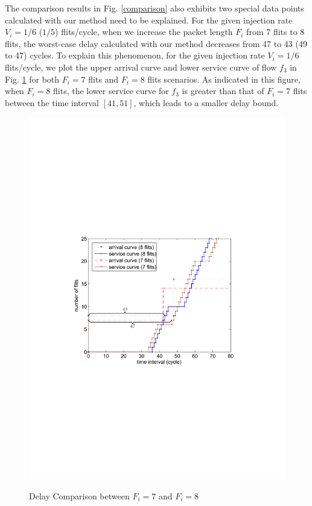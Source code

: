 \documentclass[10pt,journal]{IEEEtran}
\begin{document}
The comparison results in Fig. \ref{comparison} also exhibits two special data points calculated with our method need to be explained. For the given injection rate $V_i=1/6$ ($1/5$) flits/cycle, when we increase the packet length $F_i$ from 7 flits to 8 flits, the worst-case delay calculated with our method decreases from 47 to 43 (49 to 47) cycles. To explain this phenomenon, for the given injection rate $V_i=1/6$ flits/cycle, we plot the upper arrival curve and lower service curve of flow $f_3$ in Fig. \ref{reason} for both $F_i=7$ flits and $F_i=8$ flits scenarios. As indicated in this figure, when $F_i=8$ flits, the lower service curve for $f_3$ is greater than that of $F_i=7$ flits between the time interval $[41,51]$, which leads to a smaller delay bound.
\begin{figure}
  \centering
  \includegraphics[scale=0.63]{figures/reason.pdf}\\
  \caption{Delay Comparison between $F_i=7$ and $F_i=8$}\label{reason}
\end{figure}
\end{document}
